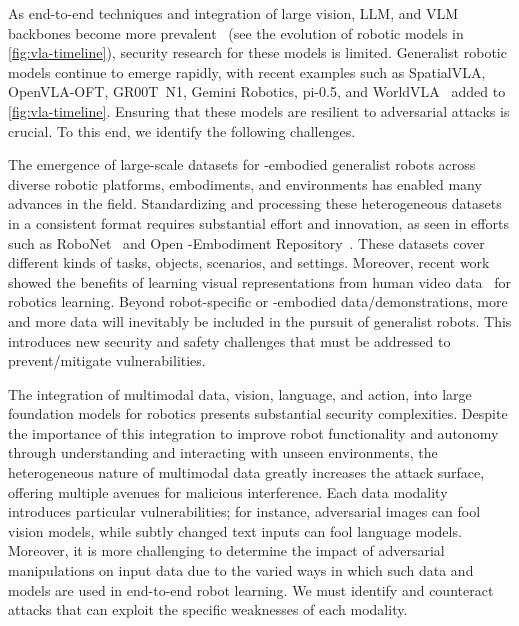 {As end-to-end techniques and integration of large vision, LLM, and VLM backbones become more prevalent~\cite{9} (see the evolution of robotic models in \autoref{fig:vla-timeline}), security research for these models is limited. Generalist robotic models continue to emerge rapidly, with recent examples such as SpatialVLA, OpenVLA-OFT, {GR00T}~N1, Gemini Robotics, pi-0.5, and WorldVLA~\cite{qu2025spatialvla,openvla_oft,gr00tn1,geminirobotics2025,pi05_2025,cen2025worldvla,cheang2024gr2} added to \autoref{fig:vla-timeline}. Ensuring that these models are resilient to adversarial attacks is crucial.
To this end, we identify the following challenges.

The emergence of large-scale datasets for {\xo}-embodied generalist robots across diverse robotic platforms, embodiments, and environments has enabled many advances in the field.
Standardizing and processing these heterogeneous datasets in a consistent format requires substantial effort and innovation, as seen in efforts such as RoboNet~\cite{dasari2020robonet} and Open {\xo}-Embodiment Repository~\cite{9}. 
These datasets cover different kinds of tasks, objects, scenarios, and settings.
Moreover, recent work showed the benefits of learning visual representations from human video data~\cite{nair2022r3m,xiao2022masked,radosavovic2022,majumdar2024we,karamcheti2023language,mu2023ec2,bahl2023affordances} for robotics learning. 
Beyond robot-specific or {\xo}-embodied data/demonstrations, more and more data will inevitably be included in the pursuit of generalist robots.
This introduces new security and safety challenges that must be addressed to prevent/mitigate vulnerabilities.


The integration of multimodal data, \ie vision, language, and action, into large foundation models for robotics presents substantial security complexities. 
Despite the importance of this integration to improve robot functionality and autonomy through understanding and interacting with unseen environments, the heterogeneous nature of multimodal data greatly increases the attack surface, offering multiple avenues for malicious interference. 
Each data modality introduces particular vulnerabilities; for instance, adversarial images can fool vision models, while subtly changed text inputs can fool language models. Moreover, it is more challenging to determine the impact of adversarial manipulations on input data due to the varied ways in which such data and models are used in end-to-end robot learning.
We must identify and counteract attacks that can exploit the specific weaknesses of each modality. 

}
